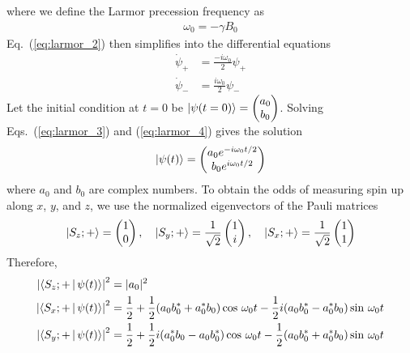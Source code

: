 where we define the Larmor precession frequency as
%
\begin{gather}
    \omega_0 = -\gamma B_0 \label{eq:larmor_freq}
\end{gather}
%
Eq.~(\ref{eq:larmor_2}) then simplifies into the differential equations
%
\begin{align}
    \dot{\psi}_+ &=\frac{-i\omega_0}{2}\psi_+ \label{eq:larmor_3}\\
    \dot{\psi}_- &=\frac{i\omega_0}{2}\psi_- \label{eq:larmor_4}
\end{align}
%
Let the initial condition at $t=0$ be 
$\Ket{\psi(t=0)}=\left( \begin{matrix}
    a_0 \\
    b_0
\end{matrix}\right)$. Solving Eqs.~(\ref{eq:larmor_3}) and (\ref{eq:larmor_4}) gives the solution
%
\begin{gather}
    \ket{\psi(t)}=\left(\begin{matrix}
        a_0e^{-i\omega_0 t/2} \\
        b_0e^{i\omega_0 t/2}
    \end{matrix}\right)\label{eq:larmor_solution}
\end{gather}
%
where $a_0$ and $b_0$ are complex numbers. To obtain the odds of measuring spin up along $x$, $y$, and $z$, we use the normalized eigenvectors of the Pauli matrices
%
\begin{gather}
    \Ket{S_z;+}=\left(\begin{matrix}
        1 \\
        0
    \end{matrix}\right),\quad
    \Ket{S_y;+}=\frac{1}{\sqrt{2}}\left(\begin{matrix}
        1 \\
        i
    \end{matrix}\right),\quad
    \Ket{S_x;+}=\frac{1}{\sqrt{2}}\left(\begin{matrix}
        1 \\
        1
    \end{matrix}\right)\label{eq:pauli_eigenvectors}
\end{gather}
%
Therefore,
%
\begin{align}
    \left| \Braket{S_z;+ | \psi(t)} \right|^2&= |a_0|^2 \\
    \left| \Braket{S_x;+ | \psi(t)} \right|^2&= \frac{1}{2} + \frac{1}{2}(a_0b_0^*+a_0^*b_0)\cos\,\omega_0t - \frac{1}{2}i(a_0b_0^*-a_0^*b_0)\sin\,\omega_0t \label{eq:larmor_5} \\
    \left| \Braket{S_y;+ | \psi(t)} \right|^2&= \frac{1}{2} + \frac{1}{2}i(a_0^*b_0-a_0b_0^*)\cos\,\omega_0t - \frac{1}{2}(a_0b_0^*+a_0^*b_0)\sin\,\omega_0t \label{eq:larmor_6}
\end{align}
